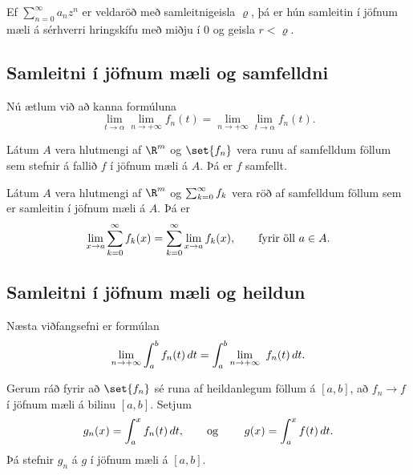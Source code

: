 \begin{se}
Ef $\sum_{n=0}^\infty a_nz^n$ er veldaröð með samleitnigeisla
$\varrho$, þá er hún samleitin í jöfnum mæli á sérhverri hringskífu
með miðju í $0$ og geisla $r<\varrho$. 
\end{se}

\subsection*{Samleitni í jöfnum mæli og samfelldni}

Nú ætlum við að kanna formúluna
 \begin{equation*}\lim_{t\to \alpha}\lim_{n\to+\infty}f_n(t)=
\lim_{n\to+\infty}\lim_{t\to \alpha}f_n(t). \label{B.2.1}
 \end{equation*}

\begin{se}\label{se:3.4.5}
 Látum $A$ vera hlutmengi af $\R\sp m$ og $\set{f_n}$ vera runu
af samfelldum föllum sem stefnir á fallið $f$ í jöfnum mæli á $A$.  Þá er
$f$ samfellt.
\end{se}


\begin{fs} 
Látum $A$ vera hlutmengi af $\R\sp m$ og $\sum_{k=0}\sp\infty
f_k$ vera röð af samfelldum föllum  sem er samleitin í jöfnum mæli á $A$.
Þá er 
 $$\lim_{x\to a} \sum\limits_{k=0}\sp\infty f_k(x) =
 \sum\limits_{k=0}\sp\infty \lim_{x\to a}f_k(x), \qquad \text{fyrir
öll $a\in A$.} 
 $$
\end{fs}



\subsection*{Samleitni í jöfnum mæli og heildun}

Næsta viðfangsefni er formúlan
\begin{equation*}
\lim_{n\to+\infty}\int_a \sp b f_n(t)  \, dt=
\int_a \sp b \lim_{n\to+\infty}\
f_n(t) \, dt.\label{B.3.1}
\end{equation*}

\begin{se}\label{se:B.3.1}
 Gerum ráð fyrir að   $\set{f_n}$ sé runa af  heildanlegum föllum á
$[a,b]$, að $f_n\to f$ í jöfnum mæli á bilinu $[a,b]$.  Setjum 
 $$g_n(x)=\int_a\sp x f_n(t)\, dt, \qquad
\text{og } \qquad g(x)=\int_a\sp x f(t)\, dt.
 $$
Þá stefnir $g_n$ á $ g$ í jöfnum mæli á $[a,b]$.
\end{se}

